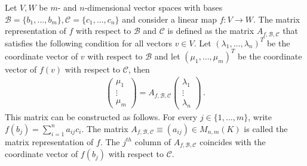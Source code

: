     \begin{construct}\label{linalgebra:matrix_representation}
        Let $V,W$ be $m$- and $n$-dimensional vector spaces with bases $\mathcal{B}=\{b_1,\ldots,b_m\},\mathcal{C}=\{c_1,\ldots,c_n\}$ and consider a linear map $f:V\rightarrow W$. The matrix representation of $f$ with respect to $\mathcal{B}$ and $\mathcal{C}$ is defined as the matrix $A_{f,\mathcal{B},\mathcal{C}}$ that satisfies the following condition for all vectors $v\in V$. Let $(\lambda_1,\ldots,\lambda_n)^T$ be the coordinate vector of $v$ with respect to $\mathcal{B}$ and let $(\mu_1,\ldots,\mu_m)^T$ be the coordinate vector of $f(v)$ with respect to $\mathcal{C}$, then
        \begin{gather}
            \label{linalgebra:matrix_representation_equation}
            \begin{pmatrix}
                \mu_1\\\vdots\\\mu_m
            \end{pmatrix}
            = A_{f,\mathcal{B},\mathcal{C}}
            \begin{pmatrix}
                \lambda_1\\\vdots\\\lambda_n
            \end{pmatrix}\,.
        \end{gather}
        This matrix can be constructed as follows. For every $j\in\{1,\ldots,m\}$, write $f(b_j)=\sum_{i=1}^na_{ij}c_i$. The matrix $A_{f,\mathcal{B},\mathcal{C}}\equiv(a_{ij})\in M_{n,m}(K)$ is called the matrix representation of $f$. The $j^{th}$ column of $A_{f,\mathcal{B},\mathcal{C}}$ coincides with the coordinate vector of $f(b_j)$ with respect to $\mathcal{C}$.
    \end{construct}

